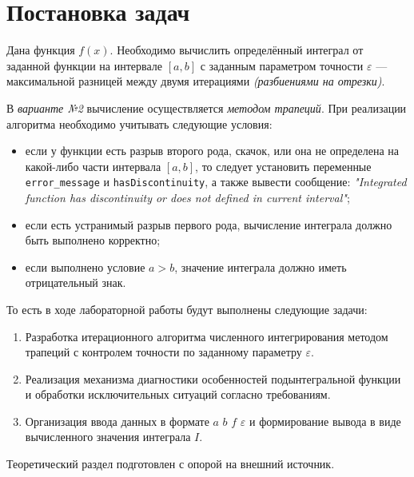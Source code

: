 \section{Постановка задач}

Дана функция $f(x)$. Необходимо вычислить определённый интеграл от заданной функции на интервале $[a, b]$ с заданным параметром точности \( \varepsilon \) --- максимальной разницей между двумя итерациями \textit{(разбиениями на отрезки)}.

В \textit{варианте №2} вычисление осуществляется \textit{методом трапеций}. При реализации алгоритма необходимо учитывать следующие условия:
\begin{itemize}
  \item если у функции есть разрыв второго рода, скачок, или она не определена на какой-либо части интервала $[a, b]$, то следует установить переменные \texttt{error\_message} и \texttt{hasDiscontinuity}, а также вывести сообщение: \textit{"Integrated function has discontinuity or does not defined in current interval"};
  \item если есть устранимый разрыв первого рода, вычисление интеграла должно быть выполнено корректно;
  \item если выполнено условие $a > b$, значение интеграла должно иметь отрицательный знак.
\end{itemize}

То есть в ходе лабораторной работы будут выполнены следующие задачи:

\begin{enumerate}
  \item Разработка итерационного алгоритма численного интегрирования методом трапеций с контролем точности по заданному параметру $\varepsilon$.
  \item Реализация механизма диагностики особенностей подынтегральной функции и обработки исключительных ситуаций согласно требованиям.
  \item Организация ввода данных в формате $a$ $b$ $f$ $\varepsilon$ и формирование вывода в виде вычисленного значения интеграла $I$.
\end{enumerate}

Теоретический раздел подготовлен с опорой на внешний источник\cite{burden2011numerical}.
